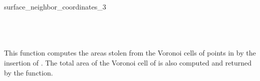 \begin{ccRefFunction}{surface_neighbor_coordinates_3}
\ccSeeAlso
{} \\
\\ 
\\  
\\

\ccImplementation This function computes the areas stolen from the
Voronoi cells of points in  by the insertion of . The
total area of the Voronoi cell of  is also computed and
returned by the function.

\end{ccRefFunction}



